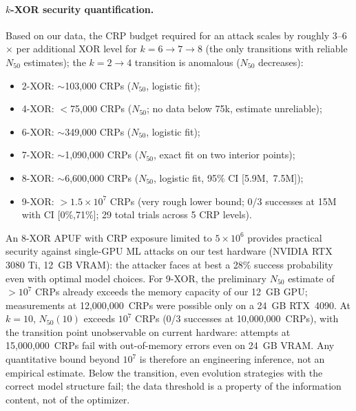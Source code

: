 \paragraph{$k$-XOR security quantification.}
Based on our data, the CRP budget required for an attack scales by
roughly 3--6$\times$ per additional XOR level for $k=6\to7\to8$ (the only
transitions with reliable $N_{50}$ estimates); the $k=2\to4$ transition is
anomalous ($N_{50}$ decreases):
\begin{itemize}
    \item 2-XOR: $\sim$103{,}000 CRPs ($N_{50}$, logistic fit);
    \item 4-XOR: $<$75{,}000 CRPs ($N_{50}$; no data below 75k, estimate unreliable);
    \item 6-XOR: $\sim$349{,}000 CRPs ($N_{50}$, logistic fit);
    \item 7-XOR: $\sim$1{,}090{,}000 CRPs ($N_{50}$, exact fit on two interior points);
    \item 8-XOR: $\sim$6{,}600{,}000 CRPs ($N_{50}$, logistic fit, 95\% CI [5.9M,~7.5M]);
    \item 9-XOR: $>1.5\times10^7$ CRPs (very rough lower bound; 0/3 successes at 15M with CI [0\%,71\%]; 29 total trials across 5 CRP levels).
\end{itemize}
An 8-XOR APUF with CRP exposure limited to $5 \times 10^6$ provides
practical security against single-GPU ML attacks on our test hardware
(NVIDIA RTX 3080 Ti, 12~GB VRAM): the attacker faces at best
a 28\% success probability even with optimal model choices.  For 9-XOR,
the preliminary $N_{50}$ estimate of $>10^7$ CRPs already exceeds the memory
capacity of our 12~GB GPU; measurements at 12{,}000{,}000~CRPs were possible
only on a 24~GB RTX~4090.  At $k = 10$, $N_{50}(10)$ exceeds $10^7$ CRPs
(0/3 successes at 10{,}000{,}000~CRPs), with the transition point
unobservable on current hardware: attempts at 15{,}000{,}000~CRPs fail with
out-of-memory errors even on 24~GB VRAM.  Any quantitative bound beyond
$10^7$ is therefore an engineering inference, not an empirical estimate.
Below the transition, even evolution strategies with the correct model
structure fail; the data threshold is a property of the information
content, not of the optimizer.

